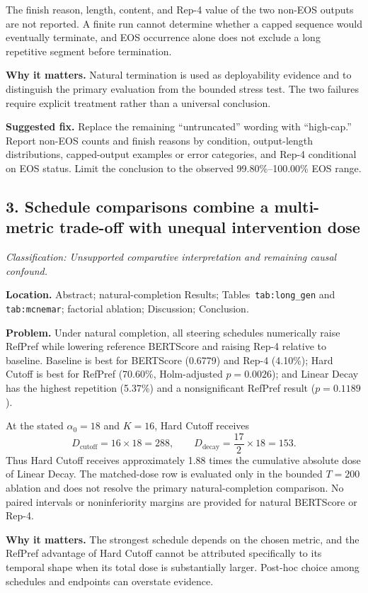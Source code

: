 \documentclass[11pt]{article}
\newcommand{\findinglabel}[1]{\textbf{#1}}
\newcommand{\classification}[1]{\textit{Classification: #1.}}
\begin{document}
The finish reason, length, content, and Rep-4 value of the two non-EOS outputs are not reported.  A finite run cannot determine whether a capped sequence would eventually terminate, and EOS occurrence alone does not exclude a long repetitive segment before termination.

\findinglabel{Why it matters.} Natural termination is used as deployability evidence and to distinguish the primary evaluation from the bounded stress test.  The two failures require explicit treatment rather than a universal conclusion.

\findinglabel{Suggested fix.} Replace the remaining ``untruncated'' wording with ``high-cap.''  Report non-EOS counts and finish reasons by condition, output-length distributions, capped-output examples or error categories, and Rep-4 conditional on EOS status.  Limit the conclusion to the observed 99.80\%--100.00\% EOS range.

\subsection*{3. Schedule comparisons combine a multi-metric trade-off with unequal intervention dose}

\classification{Unsupported comparative interpretation and remaining causal confound}

\findinglabel{Location.} Abstract; natural-completion Results; Tables~\texttt{tab:long\_gen} and \texttt{tab:mcnemar}; factorial ablation; Discussion; Conclusion.

\findinglabel{Problem.} Under natural completion, all steering schedules numerically raise RefPref while lowering reference BERTScore and raising Rep-4 relative to baseline.  Baseline is best for BERTScore (0.6779) and Rep-4 (4.10\%); Hard Cutoff is best for RefPref (70.60\%, Holm-adjusted $p=0.0026$); and Linear Decay has the highest repetition (5.37\%) and a nonsignificant RefPref result ($p=0.1189$).

At the stated $\alpha_0=18$ and $K=16$, Hard Cutoff receives
\[
D_{\text{cutoff}}=16\times18=288,
\qquad
D_{\text{decay}}=\frac{17}{2}\times18=153.
\]
Thus Hard Cutoff receives approximately 1.88 times the cumulative absolute dose of Linear Decay.  The matched-dose row is evaluated only in the bounded $T=200$ ablation and does not resolve the primary natural-completion comparison.  No paired intervals or noninferiority margins are provided for natural BERTScore or Rep-4.

\findinglabel{Why it matters.} The strongest schedule depends on the chosen metric, and the RefPref advantage of Hard Cutoff cannot be attributed specifically to its temporal shape when its total dose is substantially larger.  Post-hoc choice among schedules and endpoints can overstate evidence.
\end{document}
